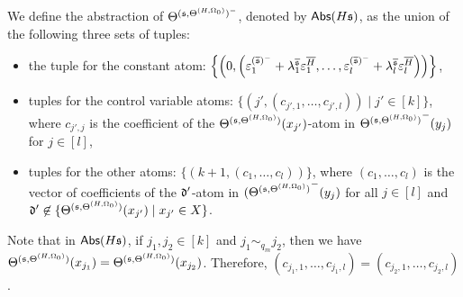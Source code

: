 We define the abstraction of $\Theta^{({\mathfrak{s} },\Theta^{(H,\Omega_0)})^-}$, denoted by $\mathsf{Abs}(H{\mathfrak{s} })$, as the union of the following three sets of tuples:
\begin{itemize}
\item the tuple for the constant atom: $\left\{\left(0, \left( \varepsilon^{(\overline{{\mathfrak{s} }})^-}_{1}+ \lambda^{\overline{{\mathfrak{s} }}}_{1} \varepsilon^{\overline{H}}_{1},\dots, \varepsilon^{(\overline{{\mathfrak{s} }})^-}_{l}+ \lambda^{\overline{{\mathfrak{s} }}}_{l} \varepsilon^{\overline{H}}_{l} \right) \right)\right\}$,
% 
\item tuples for the control variable atoms: $\{(j', (c_{j',1},\dots, c_{j', l})) \mid j' \in [k]\}$, where $c_{j', j}$ is the coefficient of the ${\Theta^{({\mathfrak{s} },\Theta^{(H,\Omega_0)})}}(x_{j'})$-atom in ${\Theta^{({\mathfrak{s} },\Theta^{(H,\Omega_0)})}}^-(y_{j})$ for $j\in[l]$,
% 
\item tuples for the other atoms: $\{(k+1, (c_1,\dots,c_l))\}$, where $(c_1,\dots,c_l)$ is the vector of coefficients of the $\mathfrak{d}'$-atom in ${(\Theta^{({\mathfrak{s} },\Theta^{(H,\Omega_0)})}}^-(y_{j})$ for all $j \in [l]$ and $\mathfrak{d}'\not\in \{{\Theta^{({\mathfrak{s} },\Theta^{(H,\Omega_0)})}}(x_{j'})\mid x_{j'}\in X\}$.
\end{itemize}
Note that in $\mathsf{Abs}(H{\mathfrak{s} })$, if $j_1, j_2 \in [k]$ and $j_1 \sim_{q_m} j_2$, then we have $\Theta^{({\mathfrak{s} },\Theta^{(H,\Omega_0)})}(x_{j_1})=\Theta^{({\mathfrak{s} },\Theta^{(H,\Omega_0)})}(x_{j_2})$. Therefore, $(c_{j_1, 1}, \dots, c_{j_1, l}) = (c_{j_2,1}, \dots, c_{j_2, l})$.

